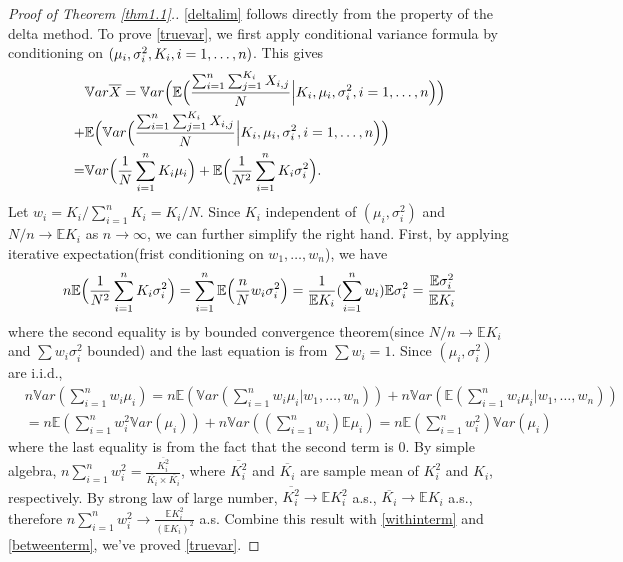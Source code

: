 \documentclass[11pt]{asaproc}
\newcommand{\var}{\ensuremath{\mathbb Var}}
\newcommand{\bbe}{\mathbb{E}}
\newcommand{\xbar}{\overline{X}}
\begin{document}
\begin{proof}[Proof of Theorem \ref{thm1.1}.]
\eqref{deltalim} follows directly from the property of the delta method. To prove \eqref{truevar}, we first apply conditional variance formula by conditioning on $(\mu_i,\sigma_i^2, K_i,\newline i=1,\dots,n)$. This gives
\begin{align*}
&\var \xbar =  \var  \Bigl( \bbe\Bigl(   \frac{\sum_{i=1}^n\sum_{j=1}^{K_i} X_{i,j}}{N} \Big| K_i,\mu_i,\sigma_i^2,  i=1,\dots,n\Bigr) \Bigr) \\
+&\bbe \Bigl(\var \Bigl( \frac{\sum_{i=1}^n\sum_{j=1}^{K_i} X_{i,j}}{N} \Big | K_i,\mu_i,\sigma_i^2,  i=1,\dots,n\Bigr)\Bigr) \notag\\
=&\var \Bigl(\frac{1}{N}\sum_{i=1}^n K_i \mu_i \Bigr)+\bbe \Bigl(\frac{1}{N^2}\sum_{i=1}^n K_i \sigma^2_i \Bigr).
\end{align*}
Let  $w_i = K_i/\sum_{i=1}^n K_i = K_i/N$. Since $K_i$ independent of $(\mu_i, \sigma^2_i)$ and $N/n \to \bbe {K_i}$ as $n\to \infty$, we can further simplify the right hand. First, by applying iterative expectation(frist conditioning on $w_1,\dots, w_n$), we have  
\begin{align}
n \bbe \Bigl(\frac{1}{N^2}\sum_{i=1}^n K_i \sigma^2_i \Bigr)  = \sum_{i=1}^n \bbe\Bigl( \frac{n}{N} w_i\sigma^2_i \Bigr) = \frac{1}{\bbe K_i}(\sum_{i=1}^n w_i)\bbe \sigma_i^2 = \frac{\bbe \sigma_i^2}{\bbe K_i} \label{withinterm}
\end{align}
where the second equality is by bounded convergence theorem(since $N/n \to \bbe {K_i}$ and $\sum w_i\sigma^2_i$ bounded) and the last equation is from $\sum w_i=1$. Since $(\mu_i, \sigma^2_i)$ are i.i.d., 
\begin{align}
&n\var (\sum_{i=1}^n w_i \mu_i) = n\bbe (\var (\sum_{i=1}^n w_i \mu_i|w_1,\dots,w_n))+ n\var (\bbe (\sum_{i=1}^n w_i \mu_i|w_1,\dots,w_n)) \\
&=  n\bbe (\sum_{i=1}^n w_i^2 \var(\mu_i)) + n \var((\sum_{i=1}^n w_i)\bbe\mu_i ) = n\bbe(\sum_{i=1}^n w_i^2) \var (\mu_i) \label {betweenterm}
\end{align}
where the last equality is from the fact that the second term is $0$. By simple algebra, 
$n \sum_{i=1}^n w_i^2 =  \frac{\overline{K_i^2}}{\overline{K_i} \times \overline{K_i}}$, where $\overline{K_i^2}$ and $\overline{K_i}$ are sample mean of $K_i^2$ and $K_i$, respectively.
By strong law of large number, $\overline{K_i^2}\to \bbe K_i^2$ a.s., $\overline{K_i}\to \bbe K_i$ a.s., therefore $n \sum_{i=1}^n w_i^2 \to  \frac{\bbe{K_i^2}}{(\bbe{K_i})^2}$ a.s. Combine this result with \eqref{withinterm} and \eqref{betweenterm}, we've proved \eqref{truevar}.


\end{proof}
\end{document}
